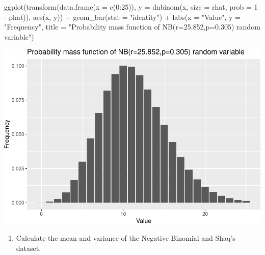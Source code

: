 \documentclass[
  11pt,
]{book}
\newenvironment{Shaded}{\begin{snugshade}}{\end{snugshade}}
\newcommand{\AttributeTok}[1]{\textcolor[rgb]{0.77,0.63,0.00}{#1}}
\newcommand{\DecValTok}[1]{\textcolor[rgb]{0.00,0.00,0.81}{#1}}
\newcommand{\FunctionTok}[1]{\textcolor[rgb]{0.00,0.00,0.00}{#1}}
\newcommand{\NormalTok}[1]{#1}
\newcommand{\OtherTok}[1]{\textcolor[rgb]{0.56,0.35,0.01}{#1}}
\newcommand{\SpecialCharTok}[1]{\textcolor[rgb]{0.00,0.00,0.00}{#1}}
\newcommand{\StringTok}[1]{\textcolor[rgb]{0.31,0.60,0.02}{#1}}
\providecommand{\tightlist}{%
  \setlength{\itemsep}{0pt}\setlength{\parskip}{0pt}}
\theoremstyle{definition}
\theoremstyle{definition}
\theoremstyle{definition}
\theoremstyle{definition}
\theoremstyle{remark}
\begin{document}
\begin{Shaded}
\begin{Highlighting}[]
\FunctionTok{ggplot}\NormalTok{(}\FunctionTok{transform}\NormalTok{(}\FunctionTok{data.frame}\NormalTok{(}\AttributeTok{x =} \FunctionTok{c}\NormalTok{(}\DecValTok{0}\SpecialCharTok{:}\DecValTok{25}\NormalTok{)), }\AttributeTok{y =} \FunctionTok{dnbinom}\NormalTok{(x, }\AttributeTok{size =}\NormalTok{ rhat, }\AttributeTok{prob =} \DecValTok{1} \SpecialCharTok{{-}}
\NormalTok{    phat)), }\FunctionTok{aes}\NormalTok{(x, y)) }\SpecialCharTok{+} \FunctionTok{geom\_bar}\NormalTok{(}\AttributeTok{stat =} \StringTok{"identity"}\NormalTok{) }\SpecialCharTok{+} \FunctionTok{labs}\NormalTok{(}\AttributeTok{x =} \StringTok{"Value"}\NormalTok{, }\AttributeTok{y =} \StringTok{"Frequency"}\NormalTok{,}
    \AttributeTok{title =} \StringTok{"Probability mass function of NB(r=25.852,p=0.305) random variable"}\NormalTok{)}
\end{Highlighting}
\end{Shaded}

\includegraphics{series_files/figure-latex/unnamed-chunk-59-1.pdf}

\begin{enumerate}
\def\labelenumi{(\alph{enumi})}
\setcounter{enumi}{2}
\tightlist
\item
  Calculate the mean and variance of the Negative Binomial and Shaq's dataset.
\end{enumerate}

\begin{Shaded}
\end{Shaded}
\end{document}

